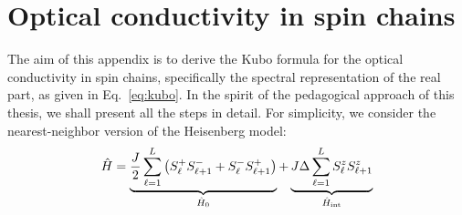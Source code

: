 \chapter{Optical conductivity in spin chains\label{app:opt_cond}}
\thispagestyle{chapterBeginStyle}


The aim of this appendix is to derive the Kubo formula for the optical conductivity in spin chains,
specifically the spectral representation of the real part, as given in Eq.~\eqref{eq:kubo}.
In the spirit of the pedagogical approach of this thesis, we shall present all the steps in detail.
For simplicity, we consider the nearest-neighbor version of the Heisenberg model:
\begin{equation}
    \hat{H}  =  \underbrace{\frac{J}{2} \sum_{\ell=1}^{L} \left(S^{+}_{\ell} S^{-}_{\ell+1} + S^{-}_{\ell}S^{+}_{\ell+1} \right)}_{\hat{H} _{0}}
    + \underbrace{J \Delta  \sum_{\ell=1}^{L} S^{z}_{\ell}S^{z}_{\ell+1}}_{\hat{H} _{\text{int}}}
    \label{eq:nn_heisenberg}
\end{equation}


